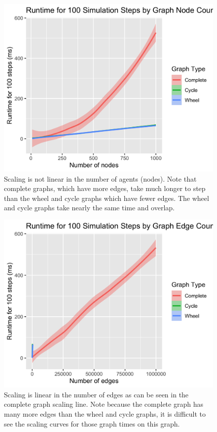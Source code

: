 \begin{figure}
\hypertarget{fig:nbenchmark}{%
\centering
\includegraphics{figures/node_count_benchmarks.png}
\caption{Scaling is not linear in the number of agents (nodes). Note
that complete graphs, which have more edges, take much longer to step
than the wheel and cycle graphs which have fewer edges. The wheel and
cycle graphs take nearly the same time and
overlap.}\label{fig:nbenchmark}
}
\end{figure}

\begin{figure}
\hypertarget{fig:ebenchmark}{%
\centering
\includegraphics{figures/edge_count_benchmarks.png}
\caption{Scaling is linear in the number of edges as can be seen in the
complete graph scaling line. Note because the complete graph has many
more edges than the wheel and cycle graphs, it is difficult to see the
scaling curves for those graph times on this
graph.}\label{fig:ebenchmark}
}
\end{figure}
